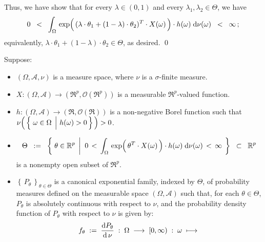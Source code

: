 Thus, we have show that for every $\lambda \in (0,1)$ and every $\lambda_{1}, \lambda_{2} \in \Theta$, we have
\begin{equation*}
0 \;\; < \;\;
	\int_{\Omega}\,
		\exp\!\left(\,
			(\lambda\cdot\theta_{1}+(1-\lambda)\cdot\theta_{2})^{T}
			\!\overset{{\color{white}-}}{\cdot}\!
			X(\omega)
		\,\right)
		\cdot
	 	h(\omega)
	\;\d\nu(\omega)
\;\; < \;\; \infty\,;
\end{equation*}
equivalently, $\lambda\cdot\theta_{1}+(1-\lambda)\cdot\theta_{2} \in \Theta$, as desired.
\qed


\begin{theorem}
\mbox{}\vskip 0.1cm
\noindent
Suppose:
\begin{itemize}
\item
	$(\Omega,\mathcal{A},\nu)$ is a measure space, where $\nu$ is a $\sigma$-finite measure.
\item
	$X : (\Omega,\mathcal{A}) \longrightarrow (\Re^{p},\mathcal{O}(\Re^{p}))$
	is a measurable $\Re^{p}$-valued function.
\item
	$h : (\Omega,\mathcal{A}) \longrightarrow (\Re,\mathcal{O}(\Re))$
	is a non-negative Borel function such that
	\,$\nu\!\left(\,\left\{\,\left.\omega\overset{{\color{white}.}}{\in}\Omega\,\;\right\vert\,h(\omega) > 0\,\right\}\,\right) > 0$.
\item
	\begin{equation*}
	\Theta
	\;\; := \;\;
		\left\{\;
			\theta \in \Re^{p}
			\;\left\vert\;\;
			0 \, < \,
			\int_{\Omega}\,
				\exp\!\left(\,\theta^{T} \!\overset{{\color{white}-}}{\cdot}\! X(\omega)\,\right) \cdot h(\omega)
			\;\d\nu(\omega)
			\, < \, \infty
			\right.
		\;\right\}
	\;\; \subset \;\; \Re^{p}
	\end{equation*}
	is a nonempty open subset of $\Re^{p}$.
\item
	$\left\{\,P_{\theta}\,\right\}_{\theta \in \Theta}$ is a canonical exponential family, indexed by $\Theta$,
	of probability measures defined on the measurable space $(\Omega,\mathcal{A})$ such that,
	for each $\theta \in \Theta$, $P_{\theta}$ is absolutely continuous with respect to $\nu$, and
	the probability density function of $P_{\theta}$ with respect to $\nu$ is given by:
	\begin{equation*}
	f_{\theta} \; := \; \dfrac{\d P_{\theta}}{\d\,\nu}
	\; : \; \Omega \; \longrightarrow \; [0,\infty) \; : \;
	\omega \; \longmapsto \;

\end{equation*}
\end{itemize}
\end{theorem}
